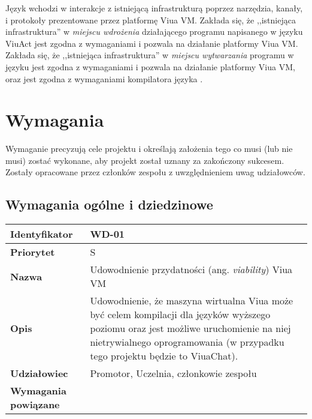 Język \ViuAct wchodzi w interakcje z istniejącą infrastrukturą poprzez narzędzia, kanały, i protokoły
prezentowane przez platformę Viua VM.
Zakłada się, że ,,istniejąca infrastruktura'' w \emph{miejscu wdrożenia} działającego programu napisanego
w języku ViuAct jest zgodna z wymaganiami i pozwala na działanie platformy Viua VM.
Zakłada się, że ,,istniejąca infrastruktura'' w \emph{miejscu wytwarzania} programu w języku \ViuAct jest
zgodna z wymaganiami i pozwala na działanie platformy Viua VM, oraz jest zgodna z wymaganiami
kompilatora języka \ViuAct.

\section{Wymagania}

Wymaganie precyzują cele projektu i określają założenia tego co musi (lub nie musi) zostać wykonane, aby
projekt został uznany za zakończony sukcesem. Zostały opracowane przez członków zespołu z uwzględnieniem
uwag udziałowców.

\subsection{Wymagania ogólne i dziedzinowe}

\phantom{}

\begin{tabular}{ | l | l | }
    \hline
    \textbf{Identyfikator} & \parbox[t]{11cm}{WD-01} \\
    \hline
    \textbf{Priorytet} & S \\
    \hline
    \textbf{Nazwa} & Udowodnienie przydatności (ang. \emph{viability}) Viua VM \\
    \hline
    \textbf{Opis} & \parbox[t]{11cm}{
        Udowodnienie, że maszyna wirtualna Viua może być celem kompilacji dla
        języków wyższego poziomu oraz jest możliwe uruchomienie na niej nietrywialnego
        oprogramowania (w przypadku tego projektu będzie to ViuaChat).} \\
    \hline
    \textbf{Udziałowiec} & Promotor, Uczelnia, członkowie zespołu \\
    \hline
    \textbf{Wymagania powiązane} & \phantom{} \\
    \hline
\end{tabular}

\vspace{1em}

